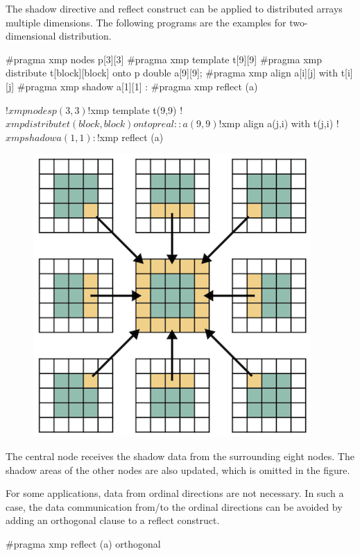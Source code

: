 The shadow directive and reflect construct can be applied to distributed
arrays multiple dimensions. The following programs are the examples for
two-dimensional distribution.

\begin{XCexample}
#pragma xmp nodes p[3][3]
#pragma xmp template t[9][9]
#pragma xmp distribute t[block][block] onto p
double a[9][9];
#pragma xmp align a[i][j] with t[i][j]
#pragma xmp shadow a[1][1]
   :
#pragma xmp reflect (a)
\end{XCexample}

\begin{XFexample}
!$xmp nodes p(3,3)
!$xmp template t(9,9)
!$xmp distribute t(block,block) onto p
real :: a(9,9)
!$xmp align a(j,i) with t(j,i)
!$xmp shadow a(1,1)
   :
!$xmp reflect (a)
\end{XFexample}

\begin{figure}
  \centering
  \includegraphics{figs/multi1.png}
\end{figure}

The central node receives the shadow data from the surrounding eight
nodes. The shadow areas of the other nodes are also updated, which is
omitted in the figure.

For some applications, data from ordinal directions are not
necessary. In such a case, the data communication from/to the ordinal
directions can be avoided by adding an orthogonal clause to a reflect
construct.

\begin{XCexample}
#pragma xmp reflect (a) orthogonal
\end{XCexample}

